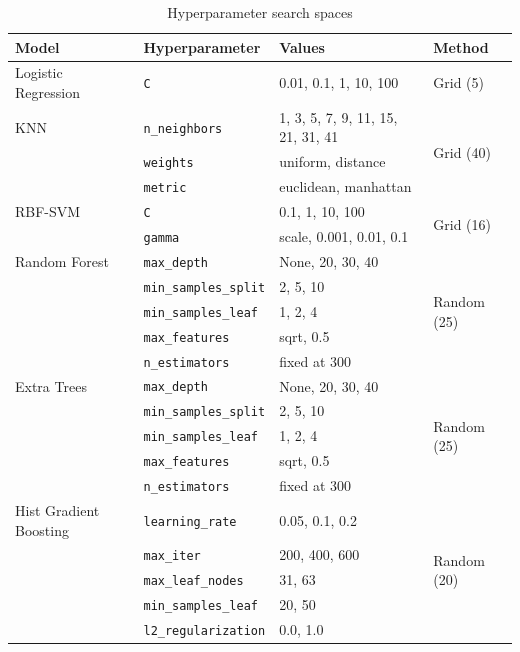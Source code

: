 \begin{table}[htbp]
\centering
\caption{Hyperparameter search spaces}
\label{tab:search_space}
\footnotesize
\begin{tabularx}{\textwidth}{@{}p{2.5cm}p{4.6cm}p{4.2cm}X@{}}
\toprule
\textbf{Model} & \textbf{Hyperparameter} & \textbf{Values} & \textbf{Method} \\
\midrule
Logistic Regression & \texttt{C} & 0.01, 0.1, 1, 10, 100 & Grid (5) \\
\addlinespace
KNN & \texttt{n\_neighbors} & 1, 3, 5, 7, 9, 11, 15, 21, 31, 41 & \multirow{3}{*}{Grid (40)} \\
 & \texttt{weights} & uniform, distance & \\
 & \texttt{metric} & euclidean, manhattan & \\
\addlinespace
RBF-SVM & \texttt{C} & 0.1, 1, 10, 100 & \multirow{2}{*}{Grid (16)} \\
 & \texttt{gamma} & scale, 0.001, 0.01, 0.1 & \\
\addlinespace
Random Forest & \texttt{max\_depth} & None, 20, 30, 40 & \multirow{5}{*}{Random (25)} \\
 & \texttt{min\_samples\_split} & 2, 5, 10 & \\
 & \texttt{min\_samples\_leaf} & 1, 2, 4 & \\
 & \texttt{max\_features} & sqrt, 0.5 & \\
 & \texttt{n\_estimators} & fixed at 300 & \\
\addlinespace
Extra Trees & \texttt{max\_depth} & None, 20, 30, 40 & \multirow{5}{*}{Random (25)} \\
 & \texttt{min\_samples\_split} & 2, 5, 10 & \\
 & \texttt{min\_samples\_leaf} & 1, 2, 4 & \\
 & \texttt{max\_features} & sqrt, 0.5 & \\
 & \texttt{n\_estimators} & fixed at 300 & \\
\addlinespace
Hist Gradient Boosting & \texttt{learning\_rate} & 0.05, 0.1, 0.2 & \multirow{5}{*}{Random (20)} \\
 & \texttt{max\_iter} & 200, 400, 600 & \\
 & \texttt{max\_leaf\_nodes} & 31, 63 & \\
 & \texttt{min\_samples\_leaf} & 20, 50 & \\
 & \texttt{l2\_regularization} & 0.0, 1.0 & \\
\bottomrule
\end{tabularx}
\end{table}

